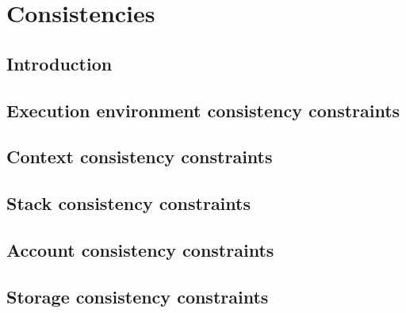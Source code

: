 

\section{Consistencies}                                                      \label{hub: consistencies}
\subsection{Introduction}                                                    \label{hub: consistencies: intro}                          \newpage
\subsection{Execution environment consistency constraints \lispDone{}}       \label{hub: consistencies: environment}      \newpage
\subsection{Context consistency constraints \lispDone{}}                     \label{hub: consistencies: context}              \newpage
\subsection{Stack   consistency constraints \lispWip {}}                     \label{hub: consistencies: stack}                  \newpage
\subsection{Account consistency constraints \lispDone{}}                     \label{hub: consistencies: account}              \newpage
\subsection{Storage consistency constraints \lispDone{}}                     \label{hub: consistencies: storage}              \newpage
